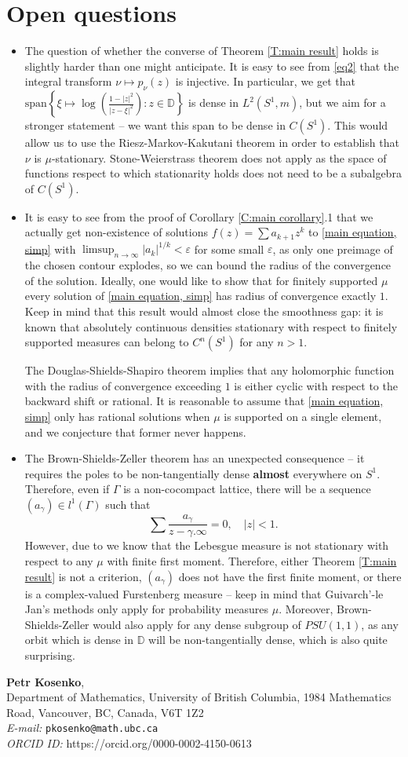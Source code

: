 \documentclass[11pt]{article}
\makeatletter
\newcommand{\Addresses}{{%
		\bigskip
		\footnotesize
		\noindent
		\textbf{Petr Kosenko}, \\
		Department of Mathematics, University of British Columbia, 1984 Mathematics Road, Vancouver, BC, Canada, V6T 1Z2 \\	
		\textit{E-mail:} \texttt{pkosenko@math.ubc.ca} \\
		\textit{ORCID ID:} https://orcid.org/0000-0002-4150-0613
}}
\makeatother
\begin{document}
\section{Open questions}
\begin{itemize}
	\item The question of whether the converse of Theorem \ref{T:main result} holds is slightly harder than one might anticipate. It is easy to see from \eqref{eq2} that the integral transform $\nu \mapsto p_\nu(z)$ is injective. In particular, we get that $\text{span} \left\lbrace  \xi \mapsto \log\left( \frac{1 - |z|^2}{|z - \xi|^2} \right) : z \in \mathbb{D} \right\rbrace $ is dense in $L^2(S^1, m)$, but we aim for a stronger statement -- we want this span to be dense in $C(S^1)$. This would allow us to use the Riesz-Markov-Kakutani theorem in order to establish that $\nu$ is $\mu$-stationary. Stone-Weierstrass theorem does not apply as the space of functions respect to which stationarity holds does not need to be a subalgebra of $C(S^1)$.
	\item It is easy to see from the proof of Corollary \ref{C:main corollary}.1 that we actually get non-existence of solutions $f(z) = \sum a_{k+1} z^k$ to \eqref{main equation, simp} with $\limsup_{n \rightarrow \infty} |a_k|^{1/k} < \varepsilon$ for some small $\varepsilon$, as only one preimage of the chosen contour explodes, so we can bound the radius of the convergence of the solution. Ideally, one would like to show that for finitely supported $\mu$ every solution of \eqref{main equation, simp} has radius of convergence exactly $1$. Keep in mind that this result would almost close the smoothness gap: it is known that absolutely continuous densities stationary with respect to finitely supported measures can belong to $C^n(S^1)$ for any $n > 1$. 
	
	The Douglas-Shields-Shapiro theorem implies that any holomorphic function with the radius of convergence exceeding $1$ is either cyclic with respect to the backward shift or rational. It is reasonable to assume that \eqref{main equation, simp} only has rational solutions when $\mu$ is supported on a single element, and we conjecture that former never happens.
	\item The Brown-Shields-Zeller theorem has an unexpected consequence -- it requires the poles to be non-tangentially dense \textbf{almost} everywhere on $S^1$. Therefore, even if $\Gamma$ is a non-cocompact lattice, there will be a sequence $(a_\gamma) \in l^1(\Gamma)$ such that
	\[
	\sum \frac{a_\gamma}{z - \gamma.\infty} = 0, \quad |z| < 1.
	\]
	However, due to \cite{guivarch1990} we know that the Lebesgue measure is not stationary with respect to any $\mu$ with finite first moment. Therefore, either Theorem \ref{T:main result} is not a criterion, $(a_\gamma)$ does not have the first finite moment, or there is a complex-valued Furstenberg measure -- keep in mind that Guivarch'-le Jan's methods only apply for probability measures $\mu$. Moreover, Brown-Shields-Zeller would also apply for any dense subgroup of $PSU(1,1)$, as any orbit which is dense in $\mathbb{D}$ will be non-tangentially dense, which is also quite surprising. 
\end{itemize}

\printbibliography
\Addresses
\end{document}
